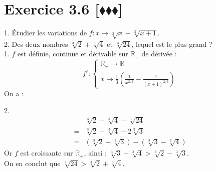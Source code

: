 \documentclass[10pt]{article}
\begin{document}

\section*{Exercice 3.6 [$\blacklozenge\blacklozenge\blacklozenge$]}
\begin{tcolorbox}[enhanced, width=6in, center, size=fbox, fontupper=\large, drop shadow southwest]
    1. Étudier les variations de $f:x\mapsto\sqrt[3]{x}-\sqrt[3]{x+1}$.\\
    2. Des deux nombres $\sqrt[3]{2}+\sqrt[3]{4}$ et $\sqrt[3]{24}$, lequel est le plus grand ?\\[0.5cm]
    1. $f$ est définie, continue et dérivable sur $\mathbb{R}_+$ de dérivée :
    \begin{equation*}
        f':\begin{cases}\mathbb{R}_+\rightarrow\mathbb{R}\\x\mapsto \frac{1}{3}\left(\frac{1}{x^{2/3}}-\frac{1}{(x+1)^{2/3}}\right)\end{cases}
    \end{equation*}
    On a :
    \begin{center}
    \end{center}
    2. 
    \begin{align*}
        &\sqrt[3]{2}+\sqrt[3]{4}-\sqrt[3]{24}\\
        =&\sqrt[3]{2}+\sqrt[3]{4}-2\sqrt[3]{3}\\
        =&(\sqrt[3]{2}-\sqrt[3]{3})-(\sqrt[3]{3}-\sqrt[3]{4})
    \end{align*}
    Or $f$ est croissante sur $\mathbb{R}_+$, ainsi : $\sqrt[3]{3}-\sqrt[3]{4}>\sqrt[3]{2}-\sqrt[3]{3}$.\\
    On en conclut que $\sqrt[3]{24}>\sqrt[3]{2}+\sqrt[3]{4} $.
\end{tcolorbox}

\end{document}
